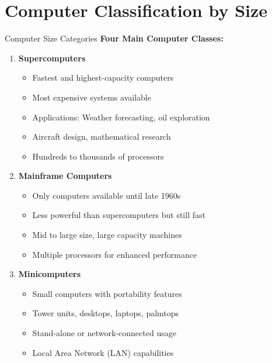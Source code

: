 \documentclass[aspectratio=169]{beamer}
\begin{document}
\section{Computer Classification by Size}

\begin{frame}{Computer Size Categories}
    \textbf{Four Main Computer Classes:}
    
    \begin{enumerate}
        \item[1.] \textbf{Supercomputers}
        \begin{itemize}
            \item Fastest and highest-capacity computers
            \item Most expensive systems available
            \item Applications: Weather forecasting, oil exploration
            \item Aircraft design, mathematical research
            \item Hundreds to thousands of processors
        \end{itemize}
        
        \item[2.] \textbf{Mainframe Computers}
        \begin{itemize}
            \item Only computers available until late 1960s
            \item Less powerful than supercomputers but still fast
            \item Mid to large size, large capacity machines
            \item Multiple processors for enhanced performance
        \end{itemize}
        
        \item[3.] \textbf{Minicomputers}
        \begin{itemize}
            \item Small computers with portability features
            \item Tower units, desktops, laptops, palmtops
            \item Stand-alone or network-connected usage
            \item Local Area Network (LAN) capabilities
        \end{itemize}
    \end{enumerate}
\end{frame}
\end{document}
